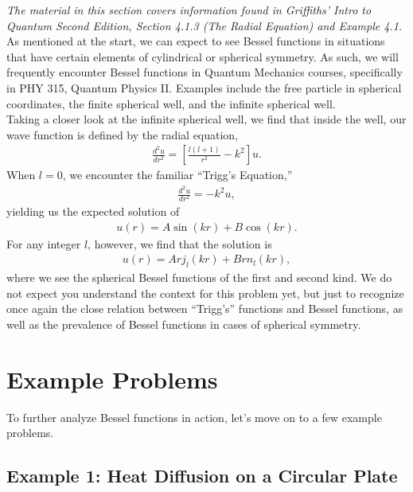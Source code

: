 \documentclass[11pt]{report}
\begin{document}

\emph{The material in this section covers information found in Griffiths’ Intro to Quantum Second Edition, Section 4.1.3 (The Radial Equation) and Example 4.1.}\\

As mentioned at the start, we can expect to see Bessel functions in situations that have certain elements of cylindrical or spherical symmetry. As such, we will frequently encounter Bessel functions in Quantum Mechanics courses, specifically in PHY 315, Quantum Physics II. Examples include the free particle in spherical coordinates, the finite spherical well, and the infinite spherical well.\\

Taking a closer look at the infinite spherical well, we find that inside the well, our wave function is defined by the radial equation,
    \begin{align*}
        \frac{d^2u}{dr^2} = \left[\frac{l(l+1)}{r^2}-k^2\right]u.
    \end{align*}
When $l=0$, we encounter the familiar ``Trigg's Equation,'' 
    \begin{align*}
        \frac{d^2u}{dr^2} = -k^2u,
    \end{align*}
yielding us the expected solution of 
    \begin{align*}
        u(r) = A\sin{(kr)} + B\cos{(kr)}.
    \end{align*}
For any integer $l$, however, we find that the solution is 
    \begin{align*}
        u(r) = Arj_l(kr) + Brn_l(kr),
    \end{align*}
where we see the spherical Bessel functions of the first and second kind. We do not expect you understand the context for this problem yet, but just to recognize once again the close relation between ``Trigg's'' functions and Bessel functions, as well as the prevalence of Bessel functions in cases of spherical symmetry.\\



\section{Example Problems}

To further analyze Bessel functions in action, let's move on to a few example problems.

\subsection{Example 1: Heat Diffusion on a Circular Plate}
\end{document}
